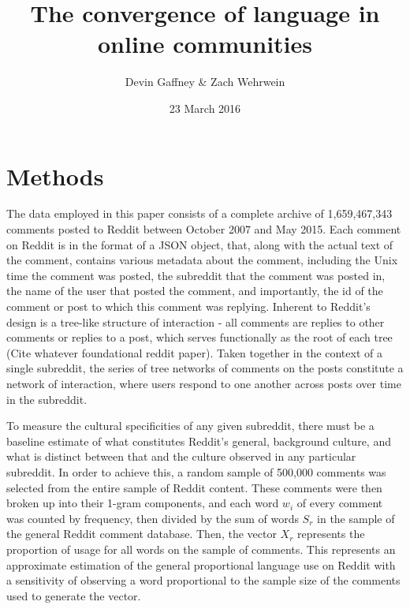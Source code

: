 \documentclass[letterpaper,12pt]{article}
\title{The convergence of language in online communities}
\date{23 March 2016}
\author{Devin Gaffney \& Zach Wehrwein}
\begin{document}
\maketitle

\onehalfspacing
\smallskip
\section{Methods}
The data employed in this paper consists of a complete archive of 1,659,467,343 comments posted to Reddit between October 2007 and May 2015. Each comment on Reddit is in the format of a JSON object, that, along with the actual text of the comment, contains various metadata about the comment, including the Unix time the comment was posted, the subreddit that the comment was posted in, the name of the user that posted the comment, and importantly, the id of the comment or post to which this comment was replying. Inherent to Reddit's design is a tree-like structure of interaction - all comments are replies to other comments or replies to a post, which serves functionally as the root of each tree (Cite whatever foundational reddit paper). Taken together in the context of a single subreddit, the series of tree networks of comments on the posts constitute a network of interaction, where users respond to one another across posts over time in the subreddit.

To measure the cultural specificities of any given subreddit, there must be a baseline estimate of what constitutes Reddit's general, background culture, and what is distinct between that and the culture observed in any particular subreddit. In order to achieve this, a random sample of 500,000 comments was selected from the entire sample of Reddit content. These comments were then broken up into their 1-gram components, and each word $w_i$ of every comment was counted by frequency, then divided by the sum of words $S_r$ in the sample of the general Reddit comment database. Then, the vector $X_r$ represents the proportion of usage for all words on the sample of comments. This represents an approximate estimation of the general proportional language use on Reddit with a sensitivity of observing a word proportional to the sample size of the comments used to generate the vector.
\end{document}
